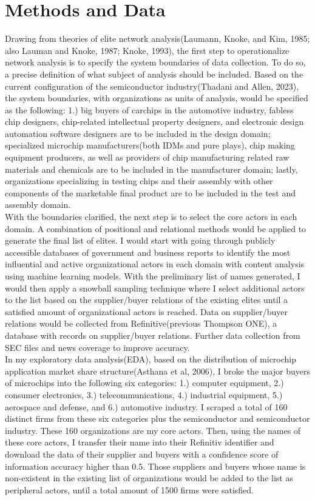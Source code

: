 \documentclass[12pt]{article}
\begin{document}
\section*{\centering Methods and Data}
\textbf{}
\indent Drawing from theories of elite network analysis(Laumann, Knoke, and Kim, 1985; also Lauman and Knoke, 1987; Knoke, 1993), the first step to operationalize network analysis is to specify the system boundaries of data collection. To do so, a precise definition of what subject of analysis should be included. Based on the current configuration of the semiconductor industry(Thadani and Allen, 2023), the system boundaries, with organizations as units of analysis, would be specified as the following: 1.) big buyers of carchips in the automotive industry, fabless chip designers, chip-related intellectual property designers, and electronic design automation software designers are to be included in the design domain; specialized microchip manufacturers(both IDMs and pure plays), chip making equipment producers, as well as providers of chip manufacturing related raw materials and chemicals are to be included in the manufacturer domain; lastly, organizations specializing in testing chips and their assembly with other components of the marketable final product are to be included in the test and assembly domain. \\ 
\indent With the boundaries clarified, the next step is to select the core actors in each domain. A combination of positional and relational methods would be applied to generate the final list of elites. I would start with going through publicly accessible databases of government and business reports to identify the most influential and active organizational actors in each domain with content analysis using machine learning models. With the preliminary list of names generated, I would then apply a snowball sampling technique where I select additional actors to the list based on the supplier/buyer relations of the existing elites until a satisfied amount of organizational actors is reached. Data on supplier/buyer relations would be collected from Refinitive(previous Thompson ONE), a database with records on supplier/buyer relations. Further data collection from SEC files and news coverage to improve accuracy. \\
\indent In my exploratory data analysis(EDA), based on the distribution of microchip application market share structure(Asthana et al, 2006), I broke the major buyers of microchips into the following six categories: 1.) computer equipment, 2.) consumer electronics, 3.) telecommunications, 4.) industrial equipment, 5.) aerospace and defense, and 6.) automotive industry. I scraped a total of 160 distinct firms from these six categories plus the semiconductor and semiconductor industry. These 160 organizations are my core actors. Then, using the names of these core actors, I transfer their name into their Refinitiv identifier and download the data of their supplier and buyers with a confidence score of information accuracy higher than 0.5. Those suppliers and buyers whose name is non-existent in the existing list of organizations would be added to the list as peripheral actors, until a total amount of 1500 firms were satisfied. \\
\end{document}
